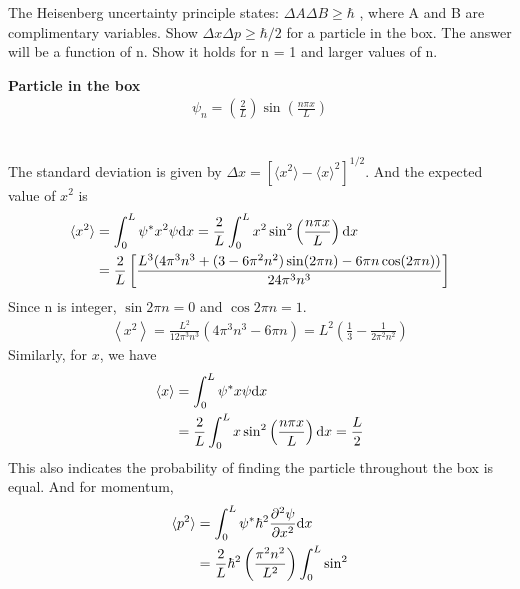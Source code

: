 \item The Heisenberg uncertainty principle states: $\Delta A\Delta B\geq\hbar$
, where A and B are complimentary variables. Show $\Delta x\Delta p\geq\hbar/2$
for a particle in the box. The answer will be a function of n. Show it
holds for n = 1 and larger values of n.
\begin{tcolorbox}
    \textbf{Particle in the box}
    \begin{align*}
        \psi_n=\left(\frac{2}{L}\right)\sin\left(\frac{n\pi x}{L}\right)
    \end{align*}
\end{tcolorbox}

\begin{solution}\ \\
    The standard deviation is given by $\Delta x=[\langle x^2\rangle-
        \langle x\rangle^2]^{1/2}$.
    And the expected value of $x^2$ is
    \begin{align*}
        \langle x^2\rangle & =\int_0^L\psi^*x^2\psi \mathrm{d} x
        =\frac{2}{L}\int_0^Lx^2\sin^2\left(\frac{n\pi x}{L}\right) \mathrm{d} x       \\
                           & =\frac{2}{L}\left[\frac{L^3(4\pi^3n^3+(3-6\pi^2n^2)
                \sin(2\pi n)-6\pi n\cos(2\pi n))}{24\pi^3n^3}\right]
    \end{align*}
    Since n is integer, $\sin2\pi n=0$ and $\cos2\pi n=1$.
    \begin{align*}
        \left\langle x^{2}\right\rangle=\frac{L^{2}}{12 \pi^{3} n^{3}}\left(4 \pi^{3} n^{3}-6 \pi n\right)
        =L^{2}\left(\frac{1}{3}-\frac{1}{2 \pi^{2} n^{2}}\right)
    \end{align*}
    Similarly, for $x$, we have
    \begin{align*}
        \langle x\rangle & =\int_{0}^{L} \psi^{*} x \psi \mathrm{d} x                                                   \\
                         & =\frac{2}{L} \int_{0}^{L} x \sin ^{2}\left(\frac{n \pi x}{L}\right) \mathrm{d} x=\frac{L}{2}
    \end{align*}
    This also indicates the probability of finding the particle throughout the box is equal.
    And for momentum,
    \begin{align*}
        \langle p^{2}\rangle & =\int_{0}^{L} \psi^* \hbar^{2} \frac{\partial^{2} \psi}{\partial x^{2}} \diff x        \\
                             & =\frac{2}{L} \hbar^{2}\left(\frac{\pi^{2} n^{2}}{L^{2}}\right) \int_{0}^{L} \sin^{2}

\end{align*}
\end{solution}
